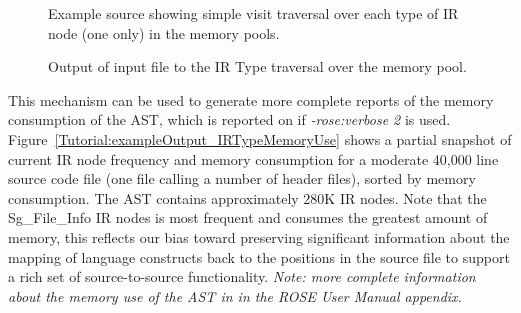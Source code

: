 \begin{figure}[!h]
{\indent
{\mySmallFontSize

\begin{latexonly}
   
\end{latexonly}

\begin{htmlonly}
   
\end{htmlonly}

}
}
\caption{Example source showing simple visit traversal over each type of IR node (one only) in the memory pools.}
\label{Tutorial:exampleIRTypeMemoryPoolVisitorTraversal}
\end{figure}


\begin{figure}[!h]
{\indent
{\mySmallFontSize

\begin{latexonly}
   
\end{latexonly}

\begin{htmlonly}
   
\end{htmlonly}

}
}
\caption{Output of input file to the IR Type traversal over the memory pool.}
\label{Tutorial:exampleOutput_IRTypeMemoryPoolVisitorTraversal}
\end{figure}

   This mechanism can be used to generate more complete reports of the memory consumption
of the AST, which is reported on if {\em -rose:verbose 2} is used.
Figure~\ref{Tutorial:exampleOutput_IRTypeMemoryUse}
shows a partial snapshot of current IR node frequency and memory consumption for
a moderate 40,000 line source code file (one file calling a number of header files),
sorted by memory consumption.  The AST contains approximately 280K IR nodes.
Note that the Sg\_File\_Info IR nodes is most frequent and consumes the greatest amount 
of memory, this reflects our bias toward preserving significant information about the
mapping of language constructs back to the positions in the source file to support
a rich set of source-to-source functionality.
{\em Note: more complete information about the memory use of the AST in in the ROSE User Manual appendix.}

